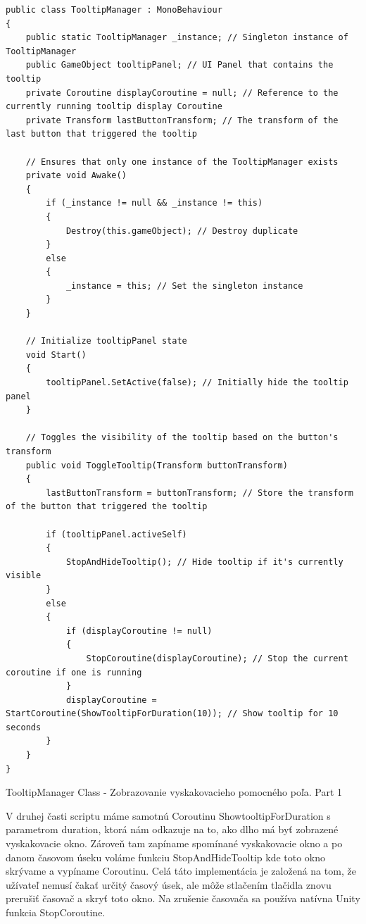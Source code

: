 \begin{algorithm}[H]
 \lstset{style=Csharp}
    \begin{lstlisting}
public class TooltipManager : MonoBehaviour
{
    public static TooltipManager _instance; // Singleton instance of TooltipManager
    public GameObject tooltipPanel; // UI Panel that contains the tooltip
    private Coroutine displayCoroutine = null; // Reference to the currently running tooltip display Coroutine
    private Transform lastButtonTransform; // The transform of the last button that triggered the tooltip
    
    // Ensures that only one instance of the TooltipManager exists
    private void Awake()
    {
        if (_instance != null && _instance != this)
        {
            Destroy(this.gameObject); // Destroy duplicate
        }
        else
        {
            _instance = this; // Set the singleton instance
        }
    }
    
    // Initialize tooltipPanel state
    void Start()
    {
        tooltipPanel.SetActive(false); // Initially hide the tooltip panel
    }
    
    // Toggles the visibility of the tooltip based on the button's transform
    public void ToggleTooltip(Transform buttonTransform)
    {
        lastButtonTransform = buttonTransform; // Store the transform of the button that triggered the tooltip
    
        if (tooltipPanel.activeSelf)
        {
            StopAndHideTooltip(); // Hide tooltip if it's currently visible
        }
        else
        {
            if (displayCoroutine != null)
            {
                StopCoroutine(displayCoroutine); // Stop the current coroutine if one is running
            }
            displayCoroutine = StartCoroutine(ShowTooltipForDuration(10)); // Show tooltip for 10 seconds
        }
    }
}
    \end{lstlisting}
     \caption{TooltipManager Class - Zobrazovanie vyskakovacieho pomocného poľa. Part 1}
     \label{tooltipManagerPart1}
\end{algorithm}

V druhej časti scriptu máme samotnú Coroutinu ShowtooltipForDuration s parametrom duration, ktorá nám odkazuje na to, ako dlho má byť zobrazené vyskakovacie okno. Zároveň tam zapíname spomínané vyskakovacie okno a po danom časovom úseku voláme funkciu StopAndHideTooltip kde toto okno skrývame a vypíname Coroutinu. Celá táto implementácia je založená na tom, že užívateľ nemusí čakať určitý časový úsek, ale môže stlačením tlačidla znovu prerušiť časovač a skryť toto okno. Na zrušenie časovača sa používa natívna Unity funkcia StopCoroutine.

